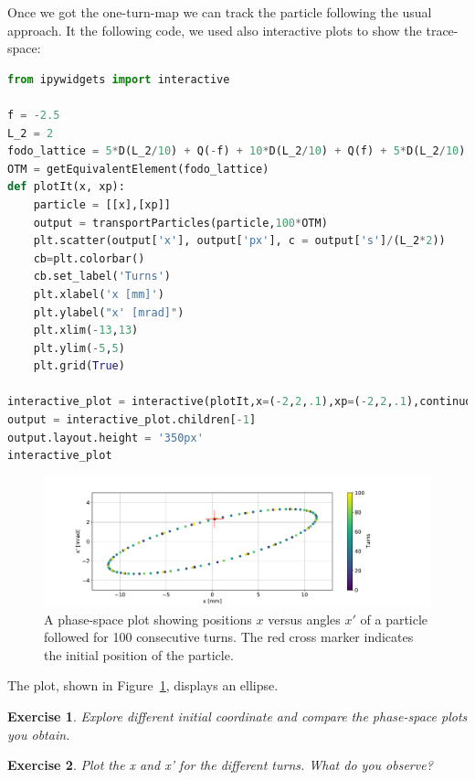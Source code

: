 \documentclass{article}
\newtheorem{exercise}{Exercise}
\begin{document}
Once we got the one-turn-map we can track the particle following the usual approach. It the following code, we used also interactive plots to show the trace-space:
\begin{lstlisting}[language=Python]
from ipywidgets import interactive

f = -2.5
L_2 = 2
fodo_lattice = 5*D(L_2/10) + Q(-f) + 10*D(L_2/10) + Q(f) + 5*D(L_2/10)
OTM = getEquivalentElement(fodo_lattice)
def plotIt(x, xp):
    particle = [[x],[xp]]
    output = transportParticles(particle,100*OTM)
    plt.scatter(output['x'], output['px'], c = output['s']/(L_2*2))
    cb=plt.colorbar()
    cb.set_label('Turns')
    plt.xlabel('x [mm]')
    plt.ylabel("x' [mrad]")
    plt.xlim(-13,13)
    plt.ylim(-5,5)
    plt.grid(True)

interactive_plot = interactive(plotIt,x=(-2,2,.1),xp=(-2,2,.1),continuous_update=True)
output = interactive_plot.children[-1]
output.layout.height = '350px'
interactive_plot
\end{lstlisting}


\begin{figure}[tb]
\begin{center}
\includegraphics[width=1\textwidth]{_img_primer/exercise_18.pdf}
\end{center}
\caption{\label{fig:ps} A phase-space plot showing positions $x$ versus angles $x'$ of a particle followed for 100 consecutive turns. The red cross marker indicates the initial position of the particle.}
\end{figure}

The plot, shown in Figure~\ref{fig:ps},
displays an ellipse. 

\begin{exercise}
Explore different initial coordinate and compare the phase-space plots you obtain.
\end{exercise}

\begin{exercise}
Plot the x and x' for the different turns. What do you observe? 
\end{exercise}
  
\end{document}
